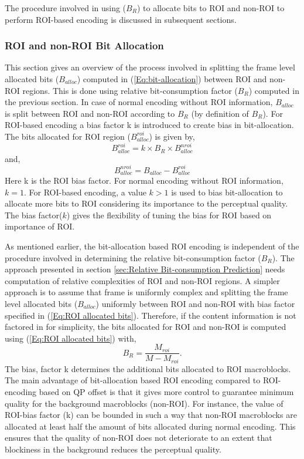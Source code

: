 \documentclass[11pt]{article} %
\begin{document}
The procedure involved in using ($B_R$) to allocate bits to ROI and non-ROI to perform ROI-based encoding is discussed in subsequent sections.

\subsubsection{ROI and non-ROI Bit Allocation}
This section gives an overview of the process involved in splitting the frame level allocated bits ($B_{alloc}$) computed in (\ref{Eq:bit-allocation}) between ROI and non-ROI regions. This is done using relative bit-consumption factor ($B_R$) computed in the previous section. In case of normal encoding without ROI information, $B_{alloc}$ is split between ROI and non-ROI according to $B_R$ (by definition of $B_R$). For ROI-based encoding a bias factor k is introduced to create bias in bit-allocation. The bits allocated for ROI region ($B_{alloc}^{roi}$) is given by,
\begin{equation}
\label{Eq:ROI allocated bits}
B_{alloc}^{roi} = k \times B_R \times B_{alloc}^{nroi}
\end{equation}
and,
$$ B_{alloc}^{nroi} = B_{alloc} - B_{alloc}^{roi}$$
Here k is the ROI bias factor. For normal encoding without ROI information, $k = 1$. For ROI-based encoding, a value $k > 1$ is used to bias bit-allocation to allocate more bits to ROI considering its importance to the perceptual quality. The bias factor($k$) gives the flexibility of tuning the bias for ROI based on importance of ROI.

As mentioned earlier, the bit-allocation based ROI encoding is independent of the procedure involved in determining the relative bit-consumption factor ($B_R$). The approach presented in section \ref{sec:Relative Bit-consumption Prediction} needs computation of relative complexities of ROI and non-ROI regions. A simpler approach is to assume that frame is uniformly complex and splitting the frame level allocated bits ($B_{alloc}$) uniformly between ROI and non-ROI with bias factor specified in (\ref{Eq:ROI allocated bits}). Therefore, if the content information is not factored in for simplicity, the bits allocated for ROI and non-ROI is computed using (\ref{Eq:ROI allocated bits}) with,
$$B_R = \frac{M_{roi}}{M - M_{roi}}.$$ 
The bias, factor k determines the additional bits allocated to ROI macroblocks. The main advantage of bit-allocation based ROI encoding compared to ROI-encoding based on QP offset is that it gives more control to guarantee minimum quality for the background macroblocks (non-ROI). For instance, the value of ROI-bias factor (k) can be bounded in such a way that non-ROI macroblocks are allocated at least half the amount of bits allocated during normal encoding. This ensures that the quality of non-ROI does not deteriorate to an extent that blockiness in the background reduces the perceptual quality.
\end{document}
